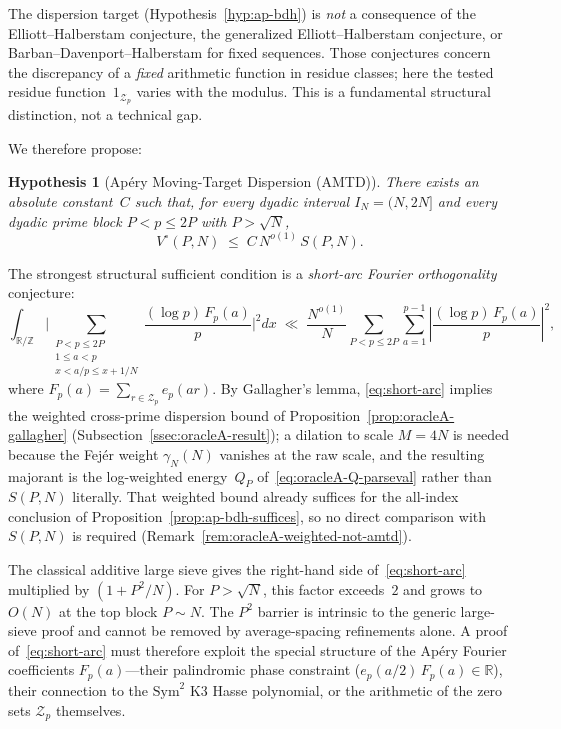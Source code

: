 \documentclass[11pt]{article}
\newtheorem{hypothesis}[theorem]{Hypothesis}
\theoremstyle{definition}
\theoremstyle{remark}
\begin{document}
The dispersion target (Hypothesis~\ref{hyp:ap-bdh}) is
\emph{not} a consequence of the Elliott--Halberstam
conjecture, the generalized Elliott--Halberstam conjecture,
or Barban--Davenport--Halberstam for fixed sequences.
Those conjectures concern the discrepancy of a
\emph{fixed} arithmetic function in residue classes;
here the tested residue function~$1_{\mathcal{Z}_p}$
varies with the modulus.
This is a fundamental structural distinction,
not a technical gap.

We therefore propose:

\begin{hypothesis}[Ap\'ery Moving-Target Dispersion (AMTD)]
\label{hyp:amtd}
There exists an absolute constant~$C$ such that,
for every dyadic interval $I_N = (N, 2N]$
and every dyadic prime block $P < p \le 2P$
with $P > \sqrt{N}$,
\[
  V^\circ(P,N)
  \;\le\; C\, N^{o(1)}\, S(P,N).
\]
\end{hypothesis}

The strongest structural sufficient condition is
a \emph{short-arc Fourier orthogonality} conjecture:
\begin{equation}\label{eq:short-arc}
  \int_{\mathbb{R}/\mathbb{Z}}
  \!\Biggl|\!
  \sum_{\substack{P < p \le 2P \\ 1 \le a < p \\
  x < a/p \le x + 1/N}}
  \!\!\frac{(\log p)\,F_p(a)}{p}
  \Biggr|^2\!\!dx
  \;\ll\;
  \frac{N^{o(1)}}{N}
  \sum_{P<p\le 2P}\sum_{a=1}^{p-1}
  \left|\frac{(\log p)\,F_p(a)}{p}\right|^{\!2},
\end{equation}
where $F_p(a) = \sum_{r \in \mathcal{Z}_p} e_p(ar)$.
By Gallagher's lemma, \eqref{eq:short-arc}
implies the weighted cross-prime dispersion bound of
Proposition~\ref{prop:oracleA-gallagher}
(Subsection~\ref{ssec:oracleA-result}); a dilation to
scale $M = 4N$ is needed because the Fej\'er weight
$\gamma_N(N)$ vanishes at the raw scale, and the
resulting majorant is the log-weighted energy~$Q_P$
of~\eqref{eq:oracleA-Q-parseval} rather than
$S(P,N)$ literally.
That weighted bound already suffices for the all-index
conclusion of Proposition~\ref{prop:ap-bdh-suffices},
so no direct comparison with $S(P,N)$ is required
(Remark~\ref{rem:oracleA-weighted-not-amtd}).

The classical additive large sieve gives the
right-hand side of~\eqref{eq:short-arc} multiplied
by $(1 + P^2/N)$. For $P > \sqrt{N}$, this factor
exceeds~$2$ and grows to~$O(N)$ at the top block
$P \sim N$. The $P^2$ barrier is intrinsic to
the generic large-sieve proof and cannot be removed
by average-spacing refinements alone.
A proof of~\eqref{eq:short-arc} must therefore exploit the
special structure of the Ap\'ery Fourier coefficients
$F_p(a)$---their palindromic phase constraint
($e_p(a/2)\,F_p(a) \in \mathbb{R}$),
their connection to the $\mathrm{Sym}^2$ K3 Hasse
polynomial, or the arithmetic of the zero sets
$\mathcal{Z}_p$ themselves.
\end{document}
